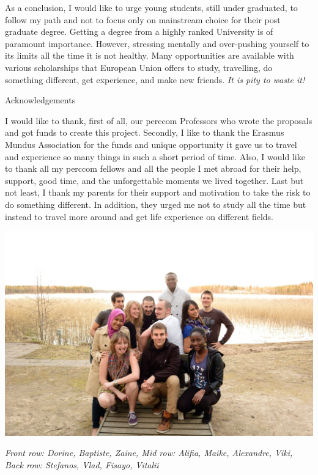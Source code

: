 \documentclass[10pt,a4paper]{article} %
\newcommand{\NewsItem}[1]{ %
\usefont{T1}{fvs}{n}{n} %
\vspace{24pt}\large #1\vspace{3pt} %
\par \normalsize \normalfont}
\begin{document}
\begin{multicols}{3}
As a conclusion, I would like to urge young students, still under graduated, to 
follow my path and not to focus only on mainstream choice for their post graduate 
degree. 
Getting a degree from a highly ranked University is of paramount importance. 
However, stressing mentally and over-pushing yourself to its limits all the time 
it is not healthy. 
Many opportunities are available with various scholarships that European Union 
offers to study, travelling, do something different, get experience, and make 
new friends. 
\textit{It is pity to waste it!} 
 
 
\NewsItem{Acknowledgements}

I would like to  thank, first of all, our {\sc perccom} Professors who wrote the 
proposals and got funds to create this project. 
Secondly, I like to thank the Erasmus Mundus Association for the funds and unique 
opportunity it gave us to travel and experience so many things in such a short 
period of time. 
Also, I would like to thank all my {\sc perccom} fellows and all the people I met 
abroad for their help, support, 
good time, and the unforgettable moments we lived together. 
Last but not least, I thank my parents for their support and motivation to take the 
risk to do something different. 
In addition, they urged me not to study all the time but instead to travel more 
around and get life experience on different fields.

\end{multicols}


\begin{center}
	\vspace{10pt}
	\includegraphics[width=1\linewidth]{media/perccom_family.jpg} %
	\vspace{10pt}
		\par\textit{Front row: Dorine, Baptiste, Zaine, Mid row: Alifia, Maike, Alexandre, Viki, Back row: Stefanos, Vlad, Fisayo, Vitalii}
\end{center}
\end{document}
